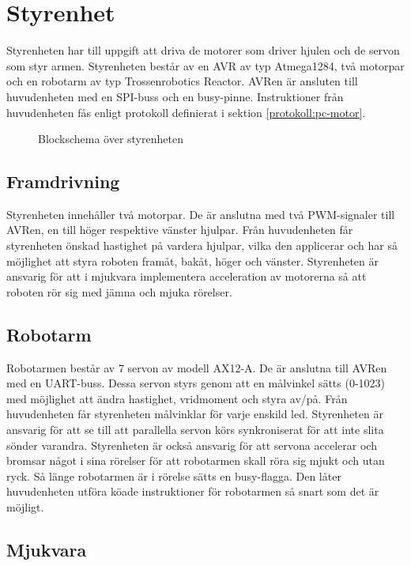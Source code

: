 \section{Styrenhet}
Styrenheten har till uppgift att driva de motorer som driver hjulen och de servon som styr armen. Styrenheten består av en AVR av typ Atmega1284, två motorpar och en robotarm av typ Trossenrobotics Reactor\cite{trossenarm}. AVRen är ansluten till huvudenheten med en SPI-buss och en busy-pinne. Instruktioner från huvudenheten fås enligt protokoll definierat i sektion \ref{protokoll:pc-motor}.

\begin{figure}[H]
\center

\caption{Blockschema över styrenheten}
\end{figure}

\subsection{Framdrivning}

Styrenheten innehåller två motorpar. De är anslutna med två PWM-signaler till AVRen, en till höger respektive vänster hjulpar. Från huvudenheten får styrenheten önskad hastighet på vardera hjulpar, vilka den applicerar och har så möjlighet att styra roboten framåt, bakåt, höger och vänster. Styrenheten är ansvarig för att i mjukvara implementera acceleration av motorerna så att roboten rör sig med jämna och mjuka rörelser.

\subsection{Robotarm}

Robotarmen består av 7 servon av modell AX12-A\cite{servo}. De är anslutna till AVRen med en UART-buss. Dessa servon styrs genom att en målvinkel sätts (0-1023) med möjlighet att ändra hastighet, vridmoment och styra av/på. Från huvudenheten får styrenheten målvinklar för varje enskild led. Styrenheten är ansvarig för att se till att parallella servon körs synkroniserat för att inte slita sönder varandra. Styrenheten är också ansvarig för att servona accelerar och bromsar något i sina rörelser för att robotarmen skall röra sig mjukt och utan ryck. Så länge robotarmen är i rörelse sätts en busy-flagga. Den låter huvudenheten utföra köade instruktioner för robotarmen så snart som det är möjligt.

\subsection{Mjukvara}

